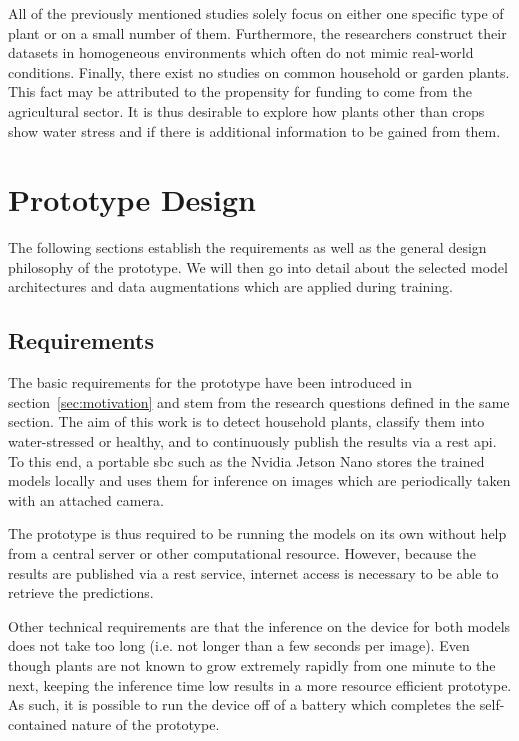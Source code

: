 \documentclass[final]{vutinfth} %
\begin{document}
All of the previously mentioned studies solely focus on either one
specific type of plant or on a small number of them. Furthermore, the
researchers construct their datasets in homogeneous environments which
often do not mimic real-world conditions. Finally, there exist no
studies on common household or garden plants. This fact may be
attributed to the propensity for funding to come from the agricultural
sector. It is thus desirable to explore how plants other than crops
show water stress and if there is additional information to be gained
from them.

\chapter{Prototype Design}
\label{chap:design}

The following sections establish the requirements as well as the
general design philosophy of the prototype. We will then go into
detail about the selected model architectures and data augmentations
which are applied during training.

\section{Requirements}
\label{sec:requirements}

The basic requirements for the prototype have been introduced in
section~\ref{sec:motivation} and stem from the research questions
defined in the same section. The aim of this work is to detect
household plants, classify them into water-stressed or healthy, and to
continuously publish the results via a \gls{rest} \gls{api}. To this
end, a portable \gls{sbc} such as the Nvidia Jetson Nano stores the
trained models locally and uses them for inference on images which are
periodically taken with an attached camera.

The prototype is thus required to be running the models on its own
without help from a central server or other computational
resource. However, because the results are published via a \gls{rest}
service, internet access is necessary to be able to retrieve the
predictions.

Other technical requirements are that the inference on the device for
both models does not take too long (i.e. not longer than a few seconds
per image). Even though plants are not known to grow extremely rapidly
from one minute to the next, keeping the inference time low results in
a more resource efficient prototype. As such, it is possible to run
the device off of a battery which completes the self-contained nature
of the prototype.
\end{document}
